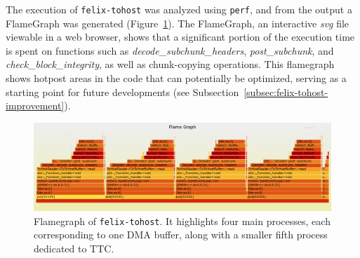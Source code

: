 The execution of \texttt{felix-tohost} was analyzed using \texttt{perf}, and from the output a FlameGraph \cite{flamegraph} was generated (Figure~\ref{fig:felix-tohost-flamegraph}). The FlameGraph, an interactive \emph{svg} file viewable in a web browser, shows that a significant portion of the execution time is spent on functions such as \emph{decode\_subchunk\_headers}, \emph{post\_subchunk}, and \emph{check\_block\_integrity}, as well as chunk-copying operations. This flamegraph shows hotpost areas in the code that can potentially be optimized, serving as a starting point for future developments (see Subsection~\ref{subsec:felix-tohost-improvement}).

\begin{figure}[htbp]
\centering
\includegraphics[width=\textwidth]{images/results/flamegraph.png}
\caption{Flamegraph of \texttt{felix-tohost}. It highlights four main processes, each corresponding to one \acs{DMA} buffer, along with a smaller fifth process dedicated to \acs{TTC}.}\label{fig:felix-tohost-flamegraph}
\end{figure}